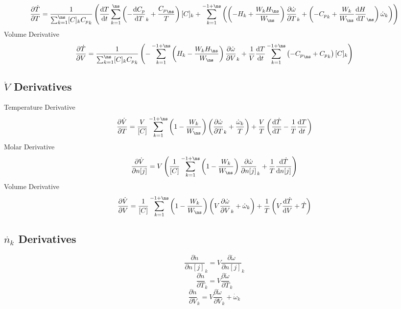 \documentclass[a4paper,10pt]{article}
\begin{document}
\begin{dmath} \frac{\partial\dot{T}}{\partial{T}} = \frac{1}{\sum_{k=1}^{\ns} [C]_{k} {C_p}_{k}} \left(\frac{\text{d} T }{\text{d} t } \sum_{k=1}^{\ns} \left(- \frac{\text{d} {C_p} }{\text{d} T }_{k} + \frac{{C_p}_{\ns}}{T}\right) [C]_{k} + \sum_{k=1}^{-1 + \ns} \left(\left(- H_{k} + \frac{W_{k} H_{\ns}}{W_{\ns}}\right) \frac{\partial \dot{\omega} }{\partial T }_{k} + \left(- {C_p}_{k} + \frac{W_{k}}{W_{\ns}} \frac{\text{d} H }{\text{d} T }_{\ns}\right) \dot{\omega}_{k}\right)\right)\end{dmath} 
Volume Derivative
\begin{dmath} \frac{\partial\dot{T}}{\partial{V}} = \frac{1}{\sum_{k=1}^{\ns} [C]_{k} {C_p}_{k}} \left(- \sum_{k=1}^{-1 + \ns} \left(H_{k} - \frac{W_{k} H_{\ns}}{W_{\ns}}\right) \frac{\partial \dot{\omega} }{\partial V }_{k} + \frac{1}{V} \frac{\text{d} T }{\text{d} t } \sum_{k=1}^{-1 + \ns} \left(- {C_p}_{\ns} + {C_p}_{k}\right) [C]_{k}\right)\end{dmath} 
\subsection{\texorpdfstring{$\dot{V}$}{dVdt} Derivatives}
Temperature Derivative
\begin{dmath} \frac{\partial \dot{ V } }{\partial T } = \frac{V}{[C]} \sum_{k=1}^{-1 + \ns} \left(1 - \frac{W_{k}}{W_{\ns}}\right) \left(\frac{\partial \dot{\omega} }{\partial T }_{k} + \frac{\dot{\omega}_{k}}{T}\right) + \frac{V}{T} \left(\frac{\text{d} \dot{T} }{\text{d} T } - \frac{1}{T} \frac{\text{d} T }{\text{d} t }\right)\end{dmath} 
Molar Derivative
\begin{dmath} \frac{\partial \dot{ V } }{\partial n[j] } = V \left(\frac{1}{[C]} \sum_{k=1}^{-1 + \ns} \left(1 - \frac{W_{k}}{W_{\ns}}\right) \frac{\partial \dot{\omega} }{\partial n[j] }_{k} + \frac{1}{T} \frac{\text{d} \dot{T} }{\text{d} n[j] }\right)\end{dmath} 
Volume Derivative
\begin{dmath} \frac{\partial \dot{ V } }{\partial V } = \frac{1}{[C]} \sum_{k=1}^{-1 + \ns} \left(1 - \frac{W_{k}}{W_{\ns}}\right) \left(V \frac{\partial \dot{\omega} }{\partial V }_{k} + \dot{\omega}_{k}\right) + \frac{1}{T} \left(V \frac{\text{d} \dot{T} }{\text{d} V } + \dot{T}\right)\end{dmath} 
\subsection{\texorpdfstring{$\dot{n_k}$}{dnkdt} Derivatives}
\begin{dmath} \frac{\partial \dot{n} }{\partial n[j] }_{k} = V \frac{\partial \dot{\omega} }{\partial n[j] }_{k}\end{dmath} 
\begin{dmath} \frac{\partial \dot{n} }{\partial T }_{k} = V \frac{\partial \dot{\omega} }{\partial T }_{k}\end{dmath} 
\begin{dmath} \frac{\partial \dot{n} }{\partial V }_{k} = V \frac{\partial \dot{\omega} }{\partial V }_{k} + \dot{\omega}_{k}\end{dmath} 
\end{document}
